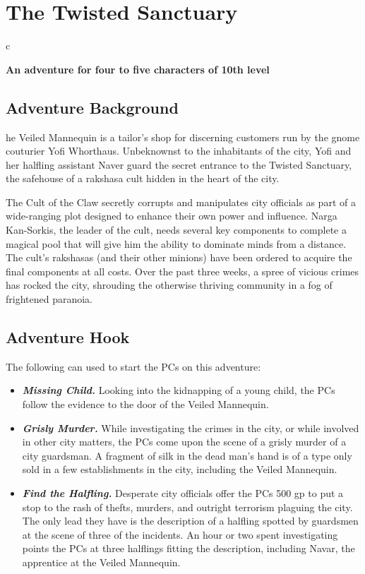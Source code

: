 \documentclass[10pt,a4paper,twoside,bg=print,twocolumn,openany,nodeprecatedcode]{dndbook}
\begin{document}
\chapter{The Twisted Sanctuary}

\begin{DndTable}{c}

\textbf{An adventure for four to five characters of 10th level}\\
\end{DndTable}

\section{Adventure Background}
he Veiled Mannequin is a tailor's shop for discerning customers run by the gnome couturier Yofi Whorthaus. Unbeknownst to the inhabitants of the city, Yofi and her halfling assistant Naver guard the secret entrance to the Twisted Sanctuary, the safehouse of a rakshasa cult hidden in the heart of the city.


The Cult of the Claw secretly corrupts and manipulates city officials as part of a wide-ranging plot designed to enhance their own power and influence. Narga Kan-Sorkis, the leader of the cult, needs several key components to complete a magical pool that will give him the ability to dominate minds from a distance. The cult's rakshasas (and their other minions) have been ordered to acquire the final components at all costs. Over the past three weeks, a spree of vicious crimes has rocked the city, shrouding the otherwise thriving community in a fog of frightened paranoia.

\section{Adventure Hook}
The following can used to start the PCs on this adventure:


\begin{itemize}
\item \textbf{\textit{Missing Child.}} Looking into the kidnapping of a young child, the PCs follow the evidence to the door of the Veiled Mannequin.
\item \textbf{\textit{Grisly Murder.}} While investigating the crimes in the city, or while involved in other city matters, the PCs come upon the scene of a grisly murder of a city guardsman. A fragment of silk in the dead man's hand is of a type only sold in a few establishments in the city, including the Veiled Mannequin.
\item \textbf{\textit{Find the Halfling.}} Desperate city officials offer the PCs 500 gp to put a stop to the rash of thefts, murders, and outright terrorism plaguing the city. The only lead they have is the description of a halfling spotted by guardsmen at the scene of three of the incidents. An hour or two spent investigating points the PCs at three halflings fitting the description, including Navar, the apprentice at the Veiled Mannequin.
\end{itemize}
\end{document}
